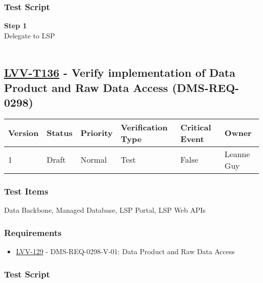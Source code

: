 \hypertarget{test-script-112}{%
\subsubsection{Test Script}\label{test-script-112}}

\textbf{Step 1}\\
Delegate to LSP\\
~\\

\hypertarget{lvv-t136---verify-implementation-of-data-product-and-raw-data-access-dms-req-0298}{%
\subsection{\texorpdfstring{\href{https://jira.lsstcorp.org/secure/Tests.jspa\#/testCase/LVV-T136}{LVV-T136}
- Verify implementation of Data Product and Raw Data Access
(DMS-REQ-0298)}{LVV-T136 - Verify implementation of Data Product and Raw Data Access (DMS-REQ-0298)}}\label{lvv-t136---verify-implementation-of-data-product-and-raw-data-access-dms-req-0298}}

\begin{longtable}[]{@{}llllll@{}}
\toprule
Version & Status & Priority & Verification Type & Critical Event &
Owner\tabularnewline
\midrule
\endhead
1 & Draft & Normal & Test & False & Leanne Guy\tabularnewline
\bottomrule
\end{longtable}

\hypertarget{test-items-112}{%
\subsubsection{Test Items}\label{test-items-112}}

Data Backbone, Managed Database, LSP Portal, LSP Web APIs~

\hypertarget{requirements-113}{%
\subsubsection{Requirements}\label{requirements-113}}

\begin{itemize}
\tightlist
\item
  \href{https://jira.lsstcorp.org/browse/LVV-129}{LVV-129} -
  DMS-REQ-0298-V-01: Data Product and Raw Data Access
\end{itemize}

\hypertarget{test-script-113}{%
\subsubsection{Test Script}\label{test-script-113}}

